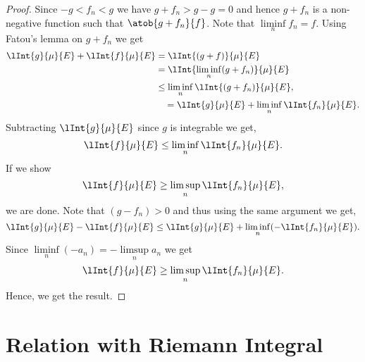 \begin{proof}
    Since $-g < f_n < g$ we have $g + f_n > g - g = 0$ and hence $g + f_n$ is a non-negative function such
    that $\atob{g+f_n}{f}$. Note that $\liminf\limits_n f_n = f$. Using
    Fatou's lemma on $g + f_n$ we get
    \begin{align*}
	\lInt{g}{\mu}{E} + \lInt{f}{\mu}{E} &= \lInt{(g+f)}{\mu}{E} \\
	&= \lInt{\liminf\limits_{n}(g+f_n)}{\mu}{E} \\
	&\leq \liminf\limits_{n}\lInt{(g+f_n)}{\mu}{E},\\
	&\quad = \lInt{g}{\mu}{E} + \liminf\limits_n\lInt{f_n}{\mu}{E}.
    \end{align*}
    Subtracting $\lInt{g}{\mu}{E}$ since $g$ is integrable we get,
    \[\lInt{f}{\mu}{E} \leq \liminf\limits_n\lInt{f_n}{\mu}{E}.\]
    If we show 
    \[\lInt{f}{\mu}{E} \geq \limsup\limits_n\lInt{f_n}{\mu}{E},\]
    we are done. Note that $(g-f_n) > 0$ and thus using the same argument we get,
    \[\lInt{g}{\mu}{E} - \lInt{f}{\mu}{E} \leq \lInt{g}{\mu}{E} + \liminf\limits_{n}(-\lInt{f_n}{\mu}{E}).\] 
    Since $\liminf\limits_{n}(-a_n) = -\limsup\limits_{n}a_n$ we get
    \[\lInt{f}{\mu}{E} \geq \limsup\limits_{n}\lInt{f_n}{\mu}{E}.\]
    Hence, we get the result.
\end{proof}
\section{Relation with Riemann Integral}
